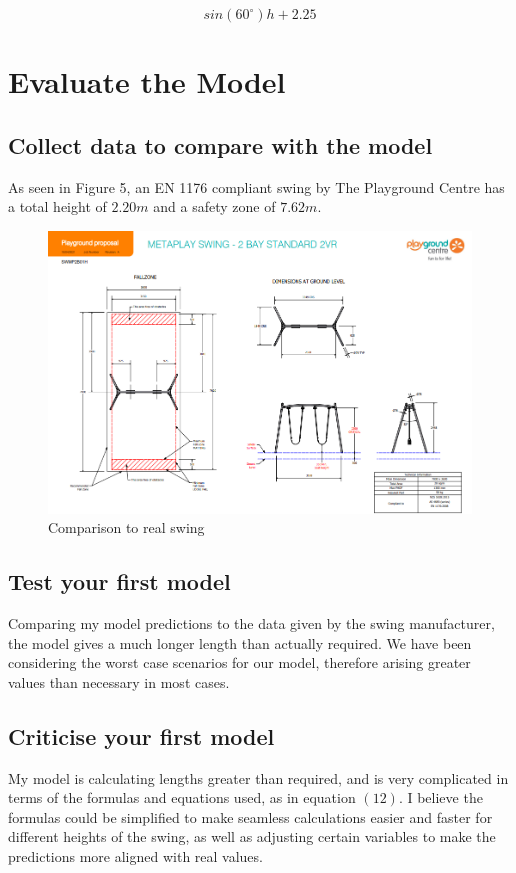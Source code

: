\documentclass{article}
\begin{document}
\begin{equation}
    sin(60^\circ)h + 2.25
\end{equation}

\section*{Evaluate the Model}

\subsection*{Collect data to compare with the model }

As seen in Figure 5, an EN 1176 compliant swing by The Playground Centre has a total height of $2.20m$ and a safety zone of $7.62m$. 

\begin{figure}[H]
    \centering
    \includegraphics[width=0.70\linewidth]{Fig 5.png}
    \caption{Comparison to real swing }
    \label{fig: Swing}
\end{figure}

\subsection*{Test your first model }
Comparing my model predictions to the data given by the swing manufacturer, the model gives a much longer length than actually required. We have been considering the worst case scenarios for our model, therefore arising greater values than necessary in most cases. 

\subsection*{Criticise your first model }
My model is calculating lengths greater than required, and is very complicated in terms of the formulas and equations used, as in equation $(12)$. I believe the formulas could be simplified to make seamless calculations easier and faster for different heights of the swing, as well as adjusting certain variables to make the predictions more aligned with real values. 
\end{document}
